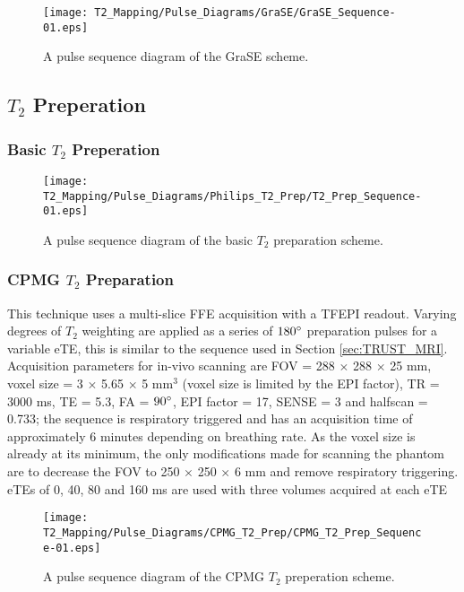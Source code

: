 \begin{figure}[H]
	\centering
	\texttt{[image: T2\_Mapping/Pulse\_Diagrams/GraSE/GraSE\_Sequence-01.eps]}
	\caption{A pulse sequence diagram of the \ac{GraSE} scheme.}
	\label{fig:t2_grase_seq}	
\end{figure}

\subsection{$T_2$ Preperation}

\subsubsection{Basic $T_2$ Preperation}

\begin{figure}[H]
	\centering
	\texttt{[image: T2\_Mapping/Pulse\_Diagrams/Philips\_T2\_Prep/T2\_Prep\_Sequence-01.eps]}
	\caption{A pulse sequence diagram of the basic $T_2$ preparation scheme.}
	\label{fig:t2_t2prep_seq}	
\end{figure}

\subsubsection{CPMG $T_2$ Preparation}

This technique uses a multi-slice \ac{FFE} acquisition with a \ac{TFEPI} readout. Varying degrees of $T_2$ weighting are applied as a series of $180\degree$ preparation pulses for a variable \ac{eTE}, this is similar to the sequence used in Section \ref{sec:TRUST_MRI}. Acquisition parameters for in-vivo scanning are \ac{FOV} = 288 $\times$ 288 $\times$ 25 mm, voxel size = 3 $\times$ 5.65 $\times$ 5 mm$^3$ (voxel size is limited by the \ac{EPI} factor), \ac{TR} = 3000 ms, \ac{TE} = 5.3, \ac{FA} = $90\degree$, \ac{EPI} factor = 17, \ac{SENSE} = 3 and halfscan = 0.733; the sequence is respiratory triggered and has an acquisition time of approximately 6 minutes depending on breathing rate. As the voxel size is already at its minimum, the only modifications made for scanning the phantom are to decrease the \ac{FOV} to 250 $\times$ 250 $\times$ 6 mm and remove respiratory triggering. \ac{eTE}s of 0, 40, 80 and 160 ms are used with three volumes acquired at each \ac{eTE}

\begin{figure}[H]
	\centering
	\texttt{[image: T2\_Mapping/Pulse\_Diagrams/CPMG\_T2\_Prep/CPMG\_T2\_Prep\_Sequence-01.eps]}
	\caption{A pulse sequence diagram of the \ac{CPMG} $T_2$ preperation scheme.}
	\label{fig:t2_cpmg_t2prep_seq}	
\end{figure}

